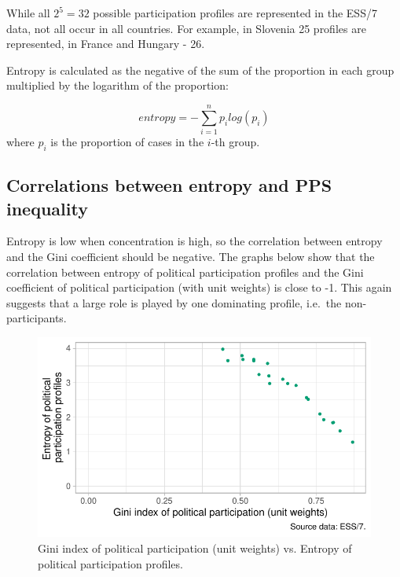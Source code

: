 \documentclass[12pt,]{article}
\begin{document}
While all \(2^5=32\) possible participation profiles are represented in the ESS/7 data, not all occur in all countries. For example, in Slovenia 25 profiles are represented, in France and Hungary - 26.

Entropy is calculated as the negative of the sum of the proportion in each group multiplied by the logarithm of the proportion:

\[ entropy =-\sum_{i=1}^{n} p_i log(p_i) \]
where \(p_i\) is the proportion of cases in the \(i\)-th group.

\hypertarget{correlations-between-entropy-and-pps-inequality}{%
\subsection{Correlations between entropy and PPS inequality}\label{correlations-between-entropy-and-pps-inequality}}

Entropy is low when concentration is high, so the correlation between entropy and the Gini coefficient should be negative. The graphs below show that the correlation between entropy of political participation profiles and the Gini coefficient of political participation (with unit weights) is close to -1. This again suggests that a large role is played by one dominating profile, i.e.~the non-participants.

\begin{figure}[H]

{\centering \includegraphics{report_files/figure-latex/ess-entropy-1} 

}

\caption{Gini index of political participation (unit weights) vs. Entropy of political participation profiles.}\label{fig:ess-entropy}
\end{figure}
\end{document}
